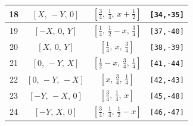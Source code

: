 \documentclass[fleqn,8pt]{jsarticle}
\begin{document}
\begin{longtable}{cccc}
18 & $\left[ X,\, - Y,\, 0 \right]$ & $\left[ \frac{3}{4},\, \frac{1}{4},\, x + \frac{1}{2} \right]$ & {\tt [34,-35]} \\ \hline
19 & $\left[ - X,\, 0,\, Y \right]$ & $\left[ \frac{1}{4},\, \frac{1}{2} - x,\, \frac{3}{4} \right]$ & {\tt [37,-40]} \\ \hline
20 & $\left[ X,\, 0,\, Y \right]$ & $\left[ \frac{1}{4},\, x,\, \frac{3}{4} \right]$ & {\tt [38,-39]} \\ \hline
21 & $\left[ 0,\, - Y,\, X \right]$ & $\left[ \frac{1}{2} - x,\, \frac{3}{4},\, \frac{1}{4} \right]$ & {\tt [41,-44]} \\ \hline
22 & $\left[ 0,\, - Y,\, - X \right]$ & $\left[ x,\, \frac{3}{4},\, \frac{1}{4} \right]$ & {\tt [42,-43]} \\ \hline
23 & $\left[ - Y,\, - X,\, 0 \right]$ & $\left[ \frac{3}{4},\, \frac{1}{4},\, x \right]$ & {\tt [45,-48]} \\ \hline
24 & $\left[ - Y,\, X,\, 0 \right]$ & $\left[ \frac{3}{4},\, \frac{1}{4},\, \frac{1}{2} - x \right]$ & {\tt [46,-47]} \\
\end{longtable}
\renewcommand{\arraystretch}{1.2}
\end{document}
